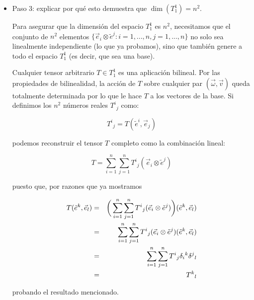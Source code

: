 \documentclass[11pt,spanish]{article}
\begin{document}
\begin{itemize}
$$
\mathbf{0}
=
\sum_{i=1}^n \sum_{j=1}^n c^i{}_j (\vec{e}_i \otimes \tilde{e}^j)
$$

Luego,
\begin{eqnarray}
0
&=&
\mathbf{0}(\tilde{e}^k,\vec{e}_l)
\notag
\\
&=&
\bigg(
\sum_{i=1}^n \sum_{j=1}^n c^i{}_j (\vec{e}_i \otimes \tilde{e}^j)
\bigg)
(\tilde{e}^k,\vec{e}_l)
\notag
\\
&=&
\sum_{i=1}^n \sum_{j=1}^n c^i{}_j (\vec{e}_i \otimes \tilde{e}^j)(\tilde{e}^k,\vec{e}_l)
\notag
\\
&=&
\sum_{i=1}^n \sum_{j=1}^n c^i{}_j\;\vec{e}_i(\tilde{e}^k)\, \tilde{e}^j(\vec{e}_l)
\notag
\\
&=&
\sum_{i=1}^n \sum_{j=1}^n c^i{}_j\;
\delta_i{}^k
\delta^j{}_l
\notag
\\
&=&
c^k{}_l
\notag
\end{eqnarray}
Como esta demostración es válida para cualquier elección de $k$ y $l$ (desde $1$ hasta $n$), concluimos que todos los coeficientes de la combinación lineal deben ser cero.
Por lo tanto, el conjunto de tensores $\vec{e}_i \otimes \tilde{e}^j$ es linealmente independiente.

\item Paso 3: explicar por qué esto demuestra que $\dim(T_1^1) = n^2$.

Para asegurar que la dimensión del espacio $T_1^1$ es $n^2$, necesitamos que el conjunto de $n^2$ elementos $\{\vec{e}_i \otimes \tilde{e}^j:i=1,...,n,j=1,...,n\}$ no solo sea linealmente independiente (lo que ya probamos), sino que también genere a todo el espacio $T_1^1$ (es decir, que sea una base).

Cualquier tensor arbitrario $T \in T_1^1$ es una aplicación bilineal. Por las propiedades de bilinealidad, la acción de $T$ sobre cualquier par $(\vec{\omega}, \vec{v})$ queda totalmente determinada por lo que le hace $T$ a los vectores de la base. Si definimos los $n^2$ números reales $T^i{}_j$ como:

$$T^i{}_j = T(\tilde{e}^i, \vec{e}_j)$$

podemos reconstruir el tensor $T$ completo como la combinación lineal:

$$T = \sum_{i=1}^n \sum_{j=1}^n T^i{}_j (\vec{e}_i \otimes \tilde{e}^j)$$

puesto que, por razones que ya mostramos

\begin{eqnarray}
T(\tilde{e}^k, \vec{e}_l)
&=&
\bigg(
\sum_{i=1}^n \sum_{j=1}^n T^i{}_j (\vec{e}_i \otimes \tilde{e}^j)
\bigg)
(\tilde{e}^k, \vec{e}_l)
\notag
\\
&=&
\sum_{i=1}^n \sum_{j=1}^n T^i{}_j (\vec{e}_i \otimes \tilde{e}^j)
(\tilde{e}^k, \vec{e}_l)
\notag
\\
&=&
\sum_{i=1}^n \sum_{j=1}^n T^i{}_j 
\delta_i{}^k
\delta^j{}_l
\notag
\\
&=&
T^k{}_l
\notag
\end{eqnarray}

probando el resultado mencionado.

\end{itemize}
\end{document}
